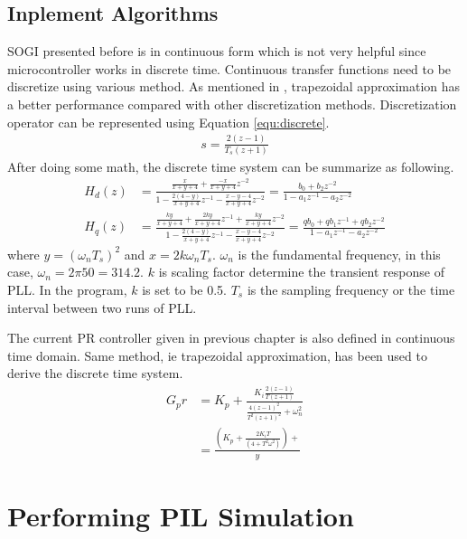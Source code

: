 \subsection{Inplement Algorithms}
\gls{SOGI} presented before is in continuous form which is not very helpful since microcontroller works in discrete time. Continuous transfer functions need to be discretize using various method. As mentioned in \cite{RN21}, trapezoidal approximation has a better performance compared with other discretization methods. Discretization operator can be represented using Equation \ref{equ:discrete}.
\begin{align}\label{equ:discrete}
    s = \frac{2(z-1)}{T_s(z+1)}
\end{align}
After doing some math, the discrete time system can be summarize as following. 
\begin{align}
    H_d(z) &= \frac{\frac{x}{x+y+4}+\frac{-x}{x+y+4}z^{-2}}{1 - \frac{2(4-y)}{x+y+4}z^{-1} - \frac{x-y-4}{x+y+4}z^{-2}} = \frac{b_0+b_2z^{-2}}{1-a_1z^{-1}-a_2z^{-2}}\\
    H_q(z) &= \frac{\frac{ky}{x+y+4}+\frac{2ky}{x+y+4}z^{-1}+\frac{ky}{x+y+4}z^{-2}}{1-\frac{2(4-y)}{x+y+4}z^{-1}-\frac{x-y-4}{x+y+4}z^{-2}} = \frac{qb_0+qb_1z^{-1}+qb_2z^{-2}}{1-a_1z^{-1}-a_2z^{-2}}
\end{align} 
where $y= (\omega_nT_s)^2$ and $x=2k\omega_nT_s$. $\omega_n$ is the fundamental frequency, in this case, $\omega_n=2\pi 50=314.2$. $k$ is scaling factor determine the transient response of \gls{PLL}. In the program, $k$ is set to be 0.5. $T_s$ is the sampling frequency or the time interval between two runs of \gls{PLL}.

The current PR controller given in previous chapter is also defined in continuous time domain. Same method, ie trapezoidal approximation, has been used to derive the discrete time system.
\begin{align}
    G_pr &= K_p+\frac{K_i\frac{2(z-1)}{T(z+1)}}{\frac{4(z-1)^2}{T^2(z+1)^2}+\omega_n^2}\\
         &= \frac{(K_p+\frac{2K_iT}{(4+T^2\omega^2)})+}{y}
\end{align}

\section{Performing \gls{PIL} Simulation}\label{sec:perform_pil}